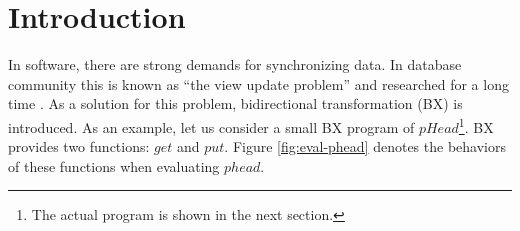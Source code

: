 \section{Introduction}



In software, there are strong demands for synchronizing data. In database community this is known as ``the view update problem'' and researched for a long time \cite{viewupdate}.
As a solution for this problem, bidirectional transformation (BX) is introduced. As an example, let us consider a small BX program of $pHead$\footnote{The actual program is shown in the next section.}. BX provides two functions: $get$ and $put$. Figure \ref{fig:eval-phead} denotes the behaviors of these functions when evaluating $phead$.

